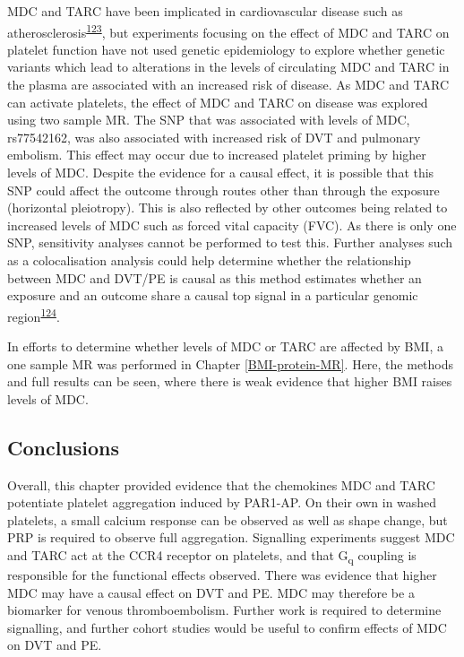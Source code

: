 \documentclass[11pt,twoside]{bristolthesis}
\begin{document}
MDC and TARC have been implicated in cardiovascular disease such as atherosclerosis\textsuperscript{\protect\hyperlink{ref-Weber2004}{123}}, but experiments focusing on the effect of MDC and TARC on platelet function have not used genetic epidemiology to explore whether genetic variants which lead to alterations in the levels of circulating MDC and TARC in the plasma are associated with an increased risk of disease. As MDC and TARC can activate platelets, the effect of MDC and TARC on disease was explored using two sample MR. The SNP that was associated with levels of MDC, rs77542162, was also associated with increased risk of DVT and pulmonary embolism. This effect may occur due to increased platelet priming by higher levels of MDC. Despite the evidence for a causal effect, it is possible that this SNP could affect the outcome through routes other than through the exposure (horizontal pleiotropy). This is also reflected by other outcomes being related to increased levels of MDC such as forced vital capacity (FVC). As there is only one SNP, sensitivity analyses cannot be performed to test this. Further analyses such as a colocalisation analysis could help determine whether the relationship between MDC and DVT/PE is causal as this method estimates whether an exposure and an outcome share a causal top signal in a particular genomic region\textsuperscript{\protect\hyperlink{ref-Giambartolomei2014}{124}}.

In efforts to determine whether levels of MDC or TARC are affected by BMI, a one sample MR was performed in Chapter \ref{BMI-protein-MR}. Here, the methods and full results can be seen, where there is weak evidence that higher BMI raises levels of MDC.

\hypertarget{conclusions}{%
\subsection{Conclusions}\label{conclusions}}

Overall, this chapter provided evidence that the chemokines MDC and TARC potentiate platelet aggregation induced by PAR1-AP. On their own in washed platelets, a small calcium response can be observed as well as shape change, but PRP is required to observe full aggregation. Signalling experiments suggest MDC and TARC act at the CCR4 receptor on platelets, and that G\textsubscript{q} coupling is responsible for the functional effects observed. There was evidence that higher MDC may have a causal effect on DVT and PE. MDC may therefore be a biomarker for venous thromboembolism. Further work is required to determine signalling, and further cohort studies would be useful to confirm effects of MDC on DVT and PE.
\end{document}

